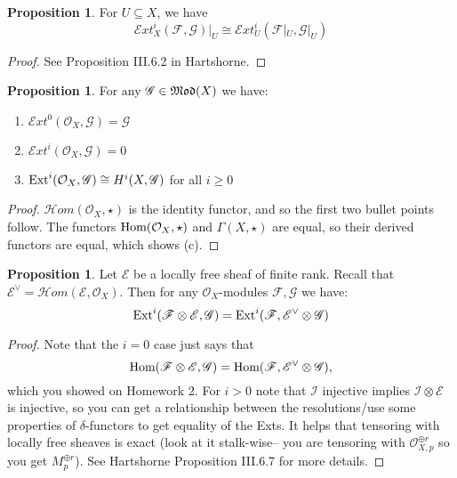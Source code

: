 \documentclass[10pt,reqno]{amsart}
\theoremstyle{definition}
\newtheorem{proposition}[theorem]{Proposition}
\theoremstyle{remark}
\numberwithin{equation}{section}
\numberwithin{theorem}{section}
\newcommand{\OO}{{\mathcal O}}
\newcommand{\Hom}{\textup{Hom}}
\newcommand{\Ext}{\textup{Ext}}
\newcommand{\scrHom}{\mathscr{H}om}
\newcommand{\scrExt}{\mathscr{E}xt}
\newcommand{\FF}{{\mathscr F}}
\newcommand{\EE}{{\mathscr E}}
\newcommand{\II}{{\mathscr I}}
\newcommand{\GG}{{\mathscr G}}
\begin{document}
\begin{proposition} For $U \subseteq X$, we have
\[\scrExt^i_X(\FF,\GG)|_U \cong \scrExt_U^i(\FF|_U, \GG|_U)\]
\end{proposition}
\begin{proof}
See Proposition III.6.2 in Hartshorne.
\end{proof}

\begin{proposition} For any $\GG \in \frak{Mod}(X)$ we have:
\begin{enumerate}
\item $\scrExt^0(\OO_X,\GG) = \GG$
\item $\scrExt^i(\OO_X,\GG) = 0$
\item $\Ext^i(\OO_X,\GG) \cong H^i(X,\GG)$ for all $i \ge 0$
\end{enumerate}
\end{proposition}
\begin{proof}
$\scrHom(\OO_X,\star)$ is the identity functor, and so the first two bullet points follow. The functors $\Hom(\OO_X,\star)$ and $\Gamma(X,\star)$ are equal, so their derived functors are equal, which shows (c).
\end{proof}

\begin{proposition} Let $\EE$ be a locally free sheaf of finite rank. Recall that $\EE^{\vee} = \scrHom(\EE,\OO_X)$. Then for any $\OO_X$-modules $\FF,\GG$ we have:
\[\Ext^i(\FF \otimes \EE, \GG) = \Ext^i(\FF,\EE^{\vee} \otimes \GG)\]
\end{proposition}
\begin{proof}
Note that the $i=0$ case just says that 
\[\Hom(\FF \otimes \EE, \GG) = \Hom(\FF,\EE^{\vee} \otimes \GG),\]
which you showed on Homework 2. For $i > 0$ note that $\II$ injective implies $\II \otimes \EE$ is injective, so you can get a relationship between the resolutions/use some properties of $\delta$-functors to get equality of the Exts. It helps that tensoring with locally free sheaves is exact (look at it stalk-wise-- you are tensoring with $\OO_{X,p}^{\oplus r}$ so you get $M_p^{\oplus r}$). See Hartshorne Proposition III.6.7 for more details.
\end{proof}
\end{document}
